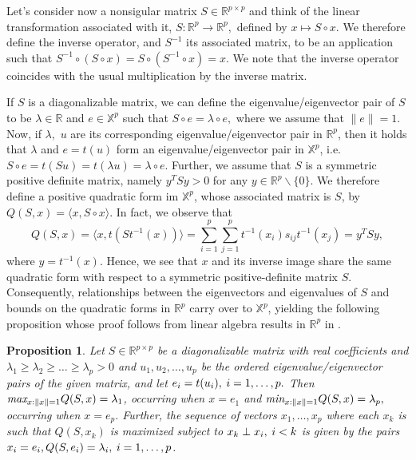 \documentclass[11pt, oneside]{book}
\theoremstyle{plain}
\newtheorem{prop}{Proposition}[section]
\theoremstyle{remark}
\begin{document}
Let's consider now a nonsigular matrix $S\in\mathbb{R}^{p\times p}$ and think
of the linear transformation associated with it, $S:\mathbb{R}^p\to\mathbb{R}^p,$
defined by $x\mapsto S\circ x.$ We therefore define the inverse operator, and
$S^{-1}$ its associated matrix, to be an application such that
$S^{-1}\circ(S\circ x) = S\circ(S^{-1}\circ x) = x.$ We note that the inverse
operator coincides with the usual multiplication by the inverse matrix. 

If $S$ is a diagonalizable matrix, we can define the eigenvalue/eigenvector pair
of $S$ to be $\lambda\in\mathbb{R}$ and $e\in\mathbb{X}^p$ such that $S\circ e =
\lambda\circ e,$ where we assume that $\lVert e\lVert = 1$. Now, if $\lambda,$
$u$ are its corresponding eigenvalue/eigenvector pair in $\mathbb{R}^p$, then it
holds that $\lambda$ and $e=t(u)$ form an eigenvalue/eigenvector pair in
$\mathbb{X}^p$, i.e. $S\circ e = t(Su) = t(\lambda u) = \lambda\circ e.$
Further, we assume that $S$ is a symmetric positive definite matrix, namely
$y^TSy>0$ for any $y\in\mathbb{R}^p\backslash\{0\}$. We therefore define a
positive quadratic form im $\mathbb{X}^p$, whose associated matrix is $S$, by
$Q(S,x) = \langle x, S\circ x\rangle.$ In fact, we observe that $$Q(S,x) =
\langle x,t\left(St^{-1}(x)\right)\rangle = \sum_{i=1}^p\sum_{j=1}^p
t^{-1}(x_i)s_{ij}t^{-1}(x_j) = y^TSy,$$ where $y = t^{-1}(x).$ Hence, we see
that $x$ and its inverse image share the same quadratic form with respect to a
symmetric positive-definite matrix $S$. Consequently, relationships between the
eigenvectors and eigenvalues of $S$ and bounds on the quadratic forms in
$\mathbb{R}^p$ carry over to $\mathbb{X}^p$, yielding the following proposition
whose proof follows from linear algebra results in $\mathbb{R}^p$ in
\cite{johnson-wichern}.
\begin{prop}
    Let $S\in\mathbb{R}^{p\times p}$ be a diagonalizable matrix with real
    coefficients and $\lambda_1\geq\lambda_2\geq\dots\geq\lambda_p> 0$ and
    $u_1,u_2,\dots,u_p$ be the ordered eigenvalue/eigenvector pairs of the given
    matrix, and let $e_i = t(u_i),\hspace{.25em}i=1,\dots,p.$ Then
    $\emph{max}_{x:\lVert x\lVert=1}Q(S,x) = \lambda_1$, occurring when $x=e_1$
    and $\emph{min}_{x:\lVert x\lVert=1}Q(S,x) = \lambda_p,$ occurring when $x =
    e_p.$ Further, the sequence of vectors $x_1,\dots,x_p$ where each $x_k$ is
    such that $Q(S,x_k)$ is maximized subject to $x_k\perp x_i,\hspace{.25em}
    i<k$ is given by the pairs $x_i=e_i, Q(S,e_i)=\lambda_i,\hspace{.25em}
    i=1,\dots,p$.
\end{prop}    
\end{document}
